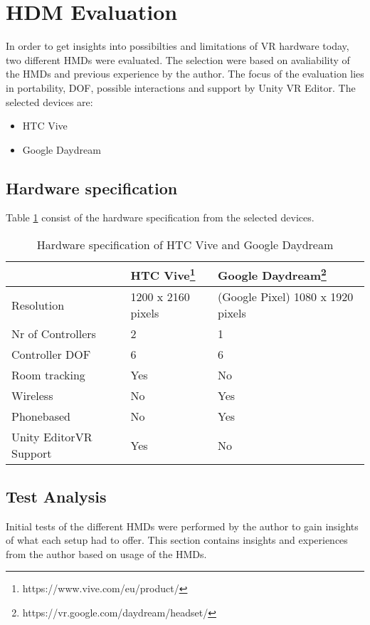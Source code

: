 \section{HDM Evaluation}
\label{result:hardware}
In order to get insights into possibilties and limitations of VR hardware today, two different HMDs were evaluated. The selection were based on avaliability of the HMDs and previous experience by the author. The focus of the evaluation lies in portability, DOF, possible interactions and support by Unity VR Editor. The selected devices are:
\begin{itemize}
  \item HTC Vive
  \item Google Daydream
\end{itemize}
\subsection{Hardware specification}
Table \ref{table:result:hardware:spec} consist of the hardware specification from the selected devices.
\begin{table}[]
\centering
\caption{Hardware specification of HTC Vive and Google Daydream}
\label{table:result:hardware:spec}
\begin{tabular}{|l|l|l|}
  \hline
                       & \textbf{HTC Vive}\footnote{https://www.vive.com/eu/product/}  & \textbf{Google Daydream}\footnote{https://vr.google.com/daydream/headset/}          \\\hline
Resolution             & 1200 x 2160 pixels & (Google Pixel) 1080 x 1920 pixels \\\hline
Nr of Controllers      & 2                  & 1                                 \\\hline
Controller DOF         & 6                  & 6                                 \\\hline
Room tracking          & Yes                & No                                \\\hline
Wireless               & No                 & Yes                               \\\hline
Phonebased             & No                 & Yes                               \\\hline
Unity EditorVR Support & Yes                & No                                \\\hline
\end{tabular}
\end{table}
\subsection{Test Analysis}
Initial tests of the different HMDs were performed by the author to gain insights of what each setup had to offer. This section contains insights and experiences from the author based on usage of the HMDs.
